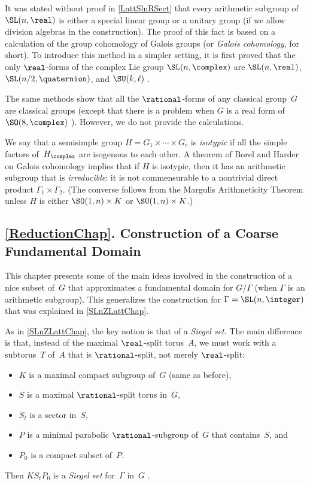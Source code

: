 \smallskip

 It was stated without proof in \cref{LattSlnRSect} that every arithmetic subgroup of $\SL(n,\real)$ is either a special linear group or a unitary group (if we allow division algebras in the construction). The proof of this fact is based on a calculation of the group cohomology of Galois groups (or \emph{Galois cohomology}, for short). To introduce this method in a simpler setting, it is first proved that the only $\real$-forms of the complex Lie group $\SL(n,\complex)$ are $\SL(n,\real)$, $\SL(n/2, \quaternion)$, and $\SU(k,\ell)$ .

\smallbreak

 The same methods show that all the $\rational$-forms of any classical group~$G$ are classical groups (except that there is a problem when $G$ is a real form of $\SO(8,\complex)$ ). However, we do not provide the calculations.

\smallbreak

 We say that a semisimple group $H = G_1 \times \cdots \times G_r$ is \emph{isotypic} if all the simple factors of~$H_\complex$ are isogenous to each other.
A theorem of Borel and Harder  on Galois cohomology implies that if $H$ is isotypic, then it has an arithmetic subgroup that is \emph{irreducible}: it is not commensurable to a nontrivial direct product $\Gamma_1 \times \Gamma_2$. (The converse follows from the Margulis Arithmeticity Theorem unless $H$ is either $\SO(1,n) \times K$ or $\SU(1,n) \times K$.)





\subsection*{\cref{ReductionChap}. Construction of a Coarse Fundamental Domain}
This chapter presents some of the main ideas involved in the construction of a nice subset of~$G$ that approximates a fundamental domain for $G/\Gamma$ (when $\Gamma$ is an arithmetic subgroup). This generalizes the construction for $\Gamma = \SL(n,\integer)$ that was explained in \cref{SLnZLattChap}.

As in \cref{SLnZLattChap}, the key notion is that of a \emph{Siegel set}. 
The main difference is that, instead of the maximal $\real$-split torus~$A$, we must work with a subtorus~$T$ of~$A$ that is $\rational$-split, not merely $\real$-split:
	\begin{itemize}
	\item $K$ is a maximal compact subgroup of~$G$ (same as before),
	\item $S$ is a maximal $\rational$-split torus in~$G$,
	\item $S_t$ is a sector in~$S$,
	\item $P$ is a minimal parabolic $\rational$-subgroup of~$G$ that contains~$S$,
	and
	\item $P_0$ is a compact subset of~$P$.
	\end{itemize}
Then $K S_t P_0$ is a \emph{Siegel set} for~$\Gamma$ in~$G$ .

